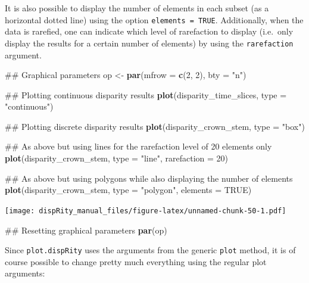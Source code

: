 \documentclass[]{book}
\newenvironment{Shaded}{\begin{snugshade}}{\end{snugshade}}
\newcommand{\KeywordTok}[1]{\textcolor[rgb]{0.13,0.29,0.53}{\textbf{#1}}}
\newcommand{\DataTypeTok}[1]{\textcolor[rgb]{0.13,0.29,0.53}{#1}}
\newcommand{\DecValTok}[1]{\textcolor[rgb]{0.00,0.00,0.81}{#1}}
\newcommand{\StringTok}[1]{\textcolor[rgb]{0.31,0.60,0.02}{#1}}
\newcommand{\OtherTok}[1]{\textcolor[rgb]{0.56,0.35,0.01}{#1}}
\newcommand{\NormalTok}[1]{#1}
\theoremstyle{definition}
\theoremstyle{definition}
\theoremstyle{remark}
\begin{document}
It is also possible to display the number of elements in each subset (as
a horizontal dotted line) using the option \texttt{elements\ =\ TRUE}.
Additionally, when the data is rarefied, one can indicate which level of
rarefaction to display (i.e.~only display the results for a certain
number of elements) by using the \texttt{rarefaction} argument.

\begin{Shaded}
\begin{Highlighting}[]
\NormalTok{## Graphical parameters}
\NormalTok{op <-}\StringTok{ }\KeywordTok{par}\NormalTok{(}\DataTypeTok{mfrow =} \KeywordTok{c}\NormalTok{(}\DecValTok{2}\NormalTok{, }\DecValTok{2}\NormalTok{), }\DataTypeTok{bty =} \StringTok{"n"}\NormalTok{)}

\NormalTok{## Plotting continuous disparity results}
\KeywordTok{plot}\NormalTok{(disparity_time_slices, }\DataTypeTok{type =} \StringTok{"continuous"}\NormalTok{)}

\NormalTok{## Plotting discrete disparity results}
\KeywordTok{plot}\NormalTok{(disparity_crown_stem, }\DataTypeTok{type =} \StringTok{"box"}\NormalTok{)}

\NormalTok{## As above but using lines for the rarefaction level of 20 elements only}
\KeywordTok{plot}\NormalTok{(disparity_crown_stem, }\DataTypeTok{type =} \StringTok{"line"}\NormalTok{, }\DataTypeTok{rarefaction =} \DecValTok{20}\NormalTok{)}

\NormalTok{## As above but using polygons while also displaying the number of elements}
\KeywordTok{plot}\NormalTok{(disparity_crown_stem, }\DataTypeTok{type =} \StringTok{"polygon"}\NormalTok{, }\DataTypeTok{elements =} \OtherTok{TRUE}\NormalTok{)}
\end{Highlighting}
\end{Shaded}

\texttt{[image: dispRity\_manual\_files/figure-latex/unnamed-chunk-50-1.pdf]}

\begin{Shaded}
\begin{Highlighting}[]
\NormalTok{## Resetting graphical parameters}
\KeywordTok{par}\NormalTok{(op)}
\end{Highlighting}
\end{Shaded}

Since \texttt{plot.dispRity} uses the arguments from the generic
\texttt{plot} method, it is of course possible to change pretty much
everything using the regular plot arguments:
\end{document}
